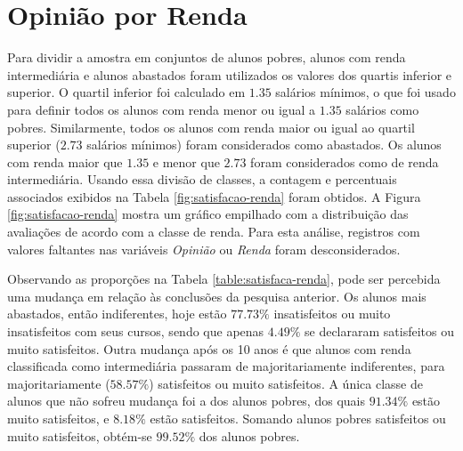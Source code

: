 \documentclass[10pt,a4paper,oneside]{article}
\begin{document}

\FloatBarrier

\section{Opinião por Renda}
\label{section:opiniao-renda}

Para dividir a amostra em conjuntos de alunos pobres, alunos com renda intermediária e alunos abastados foram utilizados os valores dos quartis inferior e superior. O quartil inferior foi calculado em $1.35$ salários mínimos, o que foi usado para definir todos os alunos com renda menor ou igual a $1.35$ salários como pobres. Similarmente, todos os alunos com renda maior ou igual ao quartil superior ($2.73$ salários mínimos) foram considerados como abastados. Os alunos com renda maior que $1.35$ e menor que $2.73$ foram considerados como de renda intermediária. Usando essa divisão de classes, a contagem e percentuais associados exibidos na Tabela \ref{fig:satisfacao-renda} foram obtidos. A Figura \ref{fig:satisfacao-renda} mostra um gráfico empilhado com a distribuição das avaliações de acordo com a classe de renda. Para esta análise, registros com valores faltantes nas variáveis \textit{Opinião} ou \textit{Renda} foram desconsiderados.


Observando as proporções na Tabela \ref{table:satisfaca-renda}, pode ser percebida uma mudança em relação às conclusões da pesquisa anterior. Os alunos mais abastados, então indiferentes, hoje estão $77.73\%$ insatisfeitos ou muito insatisfeitos com seus cursos, sendo que apenas $4.49\%$ se declararam satisfeitos ou muito satisfeitos. Outra mudança após os 10 anos é que alunos com renda classificada como intermediária passaram de majoritariamente indiferentes, para majoritariamente ($58.57\%$) satisfeitos ou muito satisfeitos. A única classe de alunos que não sofreu mudança foi a dos alunos pobres, dos quais $91.34\%$ estão muito satisfeitos, e $8.18\%$ estão satisfeitos. Somando alunos pobres satisfeitos ou muito satisfeitos, obtém-se $99.52\%$ dos alunos pobres.
\end{document}
